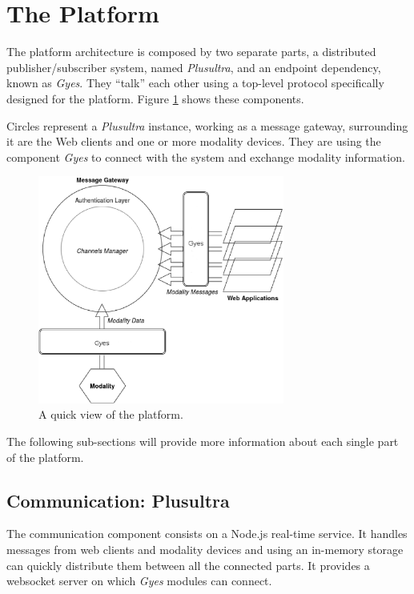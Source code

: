 \documentclass{llncs}
\begin{document}
\section{The Platform}
The platform architecture is composed by two separate parts, a distributed publisher/subscriber system, named \emph{Plusultra}, and an endpoint dependency, known as \emph{Gyes}. They ``talk'' each other using a top-level protocol specifically designed for the platform. Figure \ref{fig:arq_simple} shows these components. 

Circles represent a \emph{Plusultra} instance, working as a message gateway, surrounding it are the Web clients and one or more modality devices. They are using the component \emph{Gyes} to connect with the system and exchange modality information. 

\begin{figure}
  \centering
  \includegraphics[height=7.5cm]{arq_simple_bw.eps}
  \caption{A quick view of the platform.}
  \label{fig:arq_simple}
\end{figure}


The following sub-sections will provide more information about each single part of the platform.

\subsection{Communication: Plusultra}

The communication component consists on a Node.js \cite{ind:nodejs} real-time service. It handles messages from web clients and modality devices and using an in-memory storage can quickly distribute them between all the connected parts. It provides a websocket server on which \emph{Gyes} modules can connect.
\end{document}
